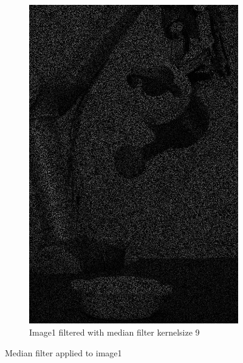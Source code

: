 \begin{figure}[H]
\begin{subfigure}[b]{0.27\textwidth}
        \includegraphics[width=\textwidth]{img1/img_1_medianBlur_9.png}
        \caption{Image1 filtered with median filter kernelsize 9}
        \label{fig:img1_median9}
    \end{subfigure}
    \caption{Median filter applied to image1}\label{fig:img_median_full}
\end{figure}


